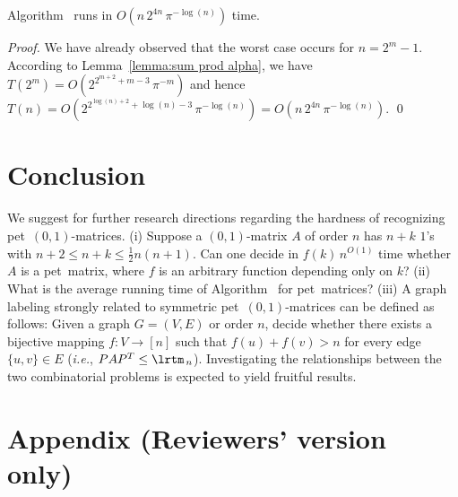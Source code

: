 \documentclass[a4paper,10pt]{llncs}
\newcommand{\PET}{pet}
\begin{document}
\begin{proposition}
\label{proposition:running time}
Algorithm~ runs in 
$O\left(
n\,2^{4n}\,\pi^{-\log(n)}
\right)$ time.
\end{proposition}

\begin{proof}%
We have already observed that the worst case occurs for $n=2^m-1$.
According to Lemma~\ref{lemma:sum prod alpha},
we have
$
T(2^m) =
O\left(
2^{2^{m+2}+m-3}\,\pi^{-m}
\right)$
and hence
$
T(n) = 
O\left(
2^{2^{\log(n)+2}+\log(n)-3}\,\pi^{-\log(n)}
\right)
=
O\left(
n\,2^{4n}\,\pi^{-\log(n)}
\right)$.
\qed
\end{proof}



\section{Conclusion}
\label{section:Conclusion}

We suggest for further research directions regarding 
the hardness of recognizing \PET\ $(0,1)$-matrices.
(i)
Suppose a $(0,1)$-matrix $A$ of order $n$ has $n+k$ $1$'s with
$n+2 \leq n+k \leq  \frac{1}{2}n(n+1)$. 
Can one decide in $f(k)\,n^{O(1)}$ time whether 
$A$ is a \PET\ matrix, where $f$ is an arbitrary function depending 
only on $k$?
(ii)
What is the average running time of Algorithm~
for \PET\ matrices?
(iii)
A graph labeling strongly related to symmetric \PET\ $(0,1)$-matrices
can be defined as follows: Given a graph $G=(V,E)$ or order $n$,
decide whether there exists a bijective mapping $f : V \to [n]$ such that
$f(u) + f(v) > n$ for every edge $\{u,v\} \in E$
(\emph{i.e.}, $PAP^T \leq \lrtm_{\,n}$).
Investigating the relationships between the two combinatorial problems
is expected to yield fruitful results.







\newpage
\section*{Appendix (Reviewers' version only)}
\end{document}
